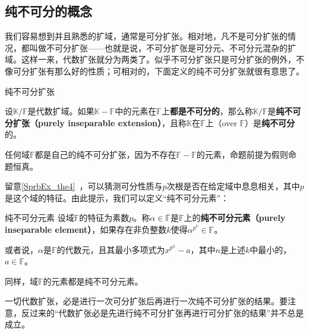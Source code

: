 


\subsection{纯不可分的概念}

我们容易想到并且熟悉的扩域，通常是可分扩张。相对地，凡不是可分扩张的情况，都叫做不可分扩张——也就是说，不可分扩张是可分元、不可分元混杂的扩域。这样一来，代数扩张就分为两类了。似乎不可分扩张只是可分扩张的例外，不像可分扩张有那么好的性质；可相对的，下面定义的纯不可分扩张就很有意思了。

\begin{definition}{纯不可分扩张}\label{PInsEx_def2}

设$\mathbb{K}/\mathbb{F}$是代数扩域。如果$\mathbb{K}-\mathbb{F}$中的元素在$\mathbb{F}$上\textbf{都是不可分的}，那么称$\mathbb{K}/\mathbb{F}$是\textbf{纯不可分扩张（purely inseparable extension）}，且称$\mathbb{K}$在$\mathbb{F}$上（over $\mathbb{F}$）是\textbf{纯不可分}的。

\end{definition}

任何域$\mathbb{F}$都是自己的纯不可分扩张，因为不存在$\mathbb{F}-\mathbb{F}$的元素，命题前提为假则命题恒真。

留意\autoref{SprbEx_the4}~，可以猜测可分性质与$p$次根是否在给定域中息息相关，其中$p$是这个域的特征。由此提示，我们可以定义“纯不可分元素”：


\begin{definition}{纯不可分元素}\label{PInsEx_def1}
设域$\mathbb{F}$的特征为素数$p$。称$\alpha\in\overline{\mathbb{F}}$是$\mathbb{F}$上的\textbf{纯不可分元素（purely inseparable element）}，如果存在非负整数$k$使得$\alpha^{p^k}\in\mathbb{F}$。

或者说，$\alpha$是$\mathbb{F}$的代数元，且其最小多项式为$x^{p^n}-a$，其中$n$是上述$k$中最小的，$a\in\mathbb{F}$。
\end{definition}

同样，域$\mathbb{F}$的元素都是纯不可分元素。



一切代数扩张，必是进行一次可分扩张后再进行一次纯不可分扩张的结果。要注意，反过来的“代数扩张必是先进行纯不可分扩张再进行可分扩张的结果”并不总是成立。




